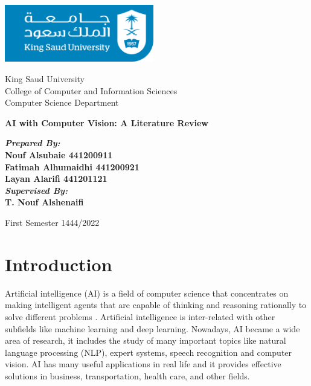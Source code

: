 \documentclass[12pt,twocolumn,a4paper]{article}
\begin{document}
    
    \begin{titlepage}
        \onecolumn
        \begin{center}
            \includegraphics[height=25mm]{ksu_masterlogo_colour_rgb.png}
            \vspace{0.3cm}
            
            \Large
            King Saud University \\
            College of Computer and Information Sciences\\
            Computer Science Department
            
            \vspace{2.5cm}
            \Huge
            \textbf{AI with Computer Vision: A Literature Review}
                
            \vspace{3.0cm}
            \Large
            \textbf{\textit{Prepared By:}\\ 
                Nouf Alsubaie \hspace{65pt}  441200911\\
                Fatimah Alhumaidhi \hspace{10pt}  441200921\\
                Layan Alarifi \hspace{75pt}  441201121\\}
            \vspace{2.5cm}
            \Large
            \textbf{\textit{Supervised By:}\\
                T. Nouf Alshenaifi}
            
            \vfill
            First Semester 1444/2022
        \end{center}
    \end{titlepage}
    
    \restoregeometry
    \twocolumn
    \justifying
    \section{Introduction}
    \hspace{0.3cm} Artificial intelligence (AI) is a field of computer science that concentrates on making intelligent agents that are capable of thinking and reasoning rationally to solve different problems \cite{Russell2020-tt}. Artificial intelligence is inter-related with other subfields like machine learning and deep learning. Nowadays, AI became a wide area of research, it includes the study of many important topics like natural language processing (NLP), expert systems, speech recognition and computer vision. AI has many useful applications in real life and it provides effective solutions in business, transportation, health care, and other fields.
    
\end{document}
